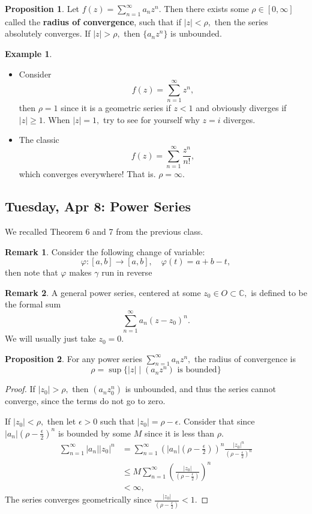 \documentclass[10pt, oneside]{article}
\newcommand{\bbC}{\mathbb{C}}
\theoremstyle{definition}
\newtheorem{exmp}{Example}[section]
\newtheorem{prop}{Proposition}
\newtheorem{rem}{Remark}
\newcommand{\bbC}{\mathbb{C}}
\begin{document}
\begin{prop}
    Let $f(z) = \sum_{n=1}^\infty a_n z^n.$ Then there exists some $\rho \in [0, \infty]$ called the \textbf{radius of convergence},  such that if $|z| < \rho,$ then the series absolutely converges. If $|z| > \rho,$ then $\{a_nz^n\}$ is unbounded.
\end{prop}
\begin{exmp}
    \begin{itemize}
        \item Consider 
        \[f(z) = \sum_{n=1  }^\infty z^n,\] then $\rho = 1$ since it is a geometric series if $z < 1$ and obviously diverges if $|z|\geq 1.$ When $|z| = 1,$ try to see for yourself why $z = i$ diverges. 
        \item The classic 
        \[f(z) = \sum_{n=1}^\infty \frac{z^n}{n!},\] which converges everywhere! That is. $\rho = \infty.$
    \end{itemize}
\end{exmp}

\newpage
\subsection{Tuesday, Apr 8: Power Series}
We recalled Theorem 6 and 7 from the previous class.

\begin{rem}
    Consider the following change of variable: 
    \[\varphi: [a,b]\to [a,b], \quad \varphi(t) = a + b - t,\] then note that $\varphi$ makes $\gamma$ run in reverse
\end{rem}

\begin{rem}
    A general power series, centered at some $z_0 \in O \subset \bbC,$ is defined to be the formal sum
    \[\sum_{n=1}^\infty a_n(z - z_0)^n.\] We will usually just take $z_0 = 0.$ 
\end{rem}

\begin{prop}
    For any power series $ \sum_{n=1}^\infty a_n z^n,$ the radius of convergence is 
    \[\rho = \sup\{|z| \mid (a_nz^n) \text{ is bounded}\}\]
\end{prop}
\begin{proof}
    If $|z_0| > \rho,$ then $(a_n z_0^n)$ is unbounded, and thus the series cannot converge, since the terms do not go to zero.

    If $|z_0| < \rho,$ then let $\epsilon >0$ such that $|z_0| = \rho - \epsilon.$ Consider that since $|a_n|(\rho - \frac{\epsilon}{2})^n$ is bounded by some $M$ since it is less than $\rho.$
    \begin{align*}
        \sum_{n=1}^\infty |a_n||z_0|^n &= \sum_{n=1}^\infty(|a_n|( \rho - \frac{\epsilon}{2}))^n \frac{|z_0|^n}{(\rho - \frac{\epsilon}{2})^n}\\
        &\leq M\sum_{n=1}^\infty \left(\frac{|z_0|}{(\rho - \frac{\epsilon}{2})}\right)^n\\
        &< \infty,
    \end{align*}
    The series converges geometrically since $\frac{|z_0|}{(\rho - \frac{\epsilon}{2})} < 1.$
\end{proof}
\end{document}
